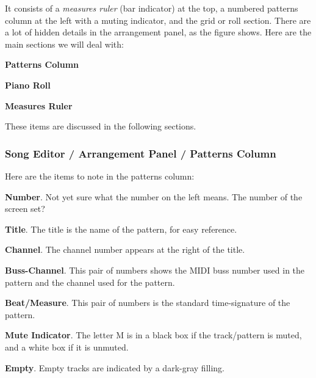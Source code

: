    It consists of a \textsl{measures ruler} (bar indicator) at the top, a
   numbered patterns column at the left with a muting indicator, and the
   grid or roll section.  There are a lot of hidden details in the
   arrangement panel, as the figure shows.  Here are the main sections we
   will deal with:

   \begin{enumber}
      \item \textbf{Patterns Column}
      \item \textbf{Piano Roll}
      \item \textbf{Measures Ruler}
   \end{enumber}

   These items are discussed in the following sections.

\subsubsection{Song Editor / Arrangement Panel / Patterns Column}
\label{subsubsec:seq24_song_editor_arrangement_panel_patterns_column}

   Here are the items to note in the patterns column:

   \begin{enumber}
      \item \textbf{Number}.
         Not yet sure what the number on the left means.
         The number of the screen set?
      \item \textbf{Title}.
         The title is the name of the pattern, for easy reference.
      \item \textbf{Channel}.
         The channel number appears at the right of the title.
      \item \textbf{Buss-Channel}.
         This pair of numbers shows the MIDI buss number used in the pattern and
         the channel used for the pattern.
      \item \textbf{Beat/Measure}.
         This pair of numbers is the standard time-signature of the pattern.
      \item \textbf{Mute Indicator}.
         The letter M is in a black box if the track/pattern is muted, and a
         white box if it is unmuted.
      \item \textbf{Empty}.
         Empty tracks are indicated by a dark-gray filling.
   \end{enumber}

